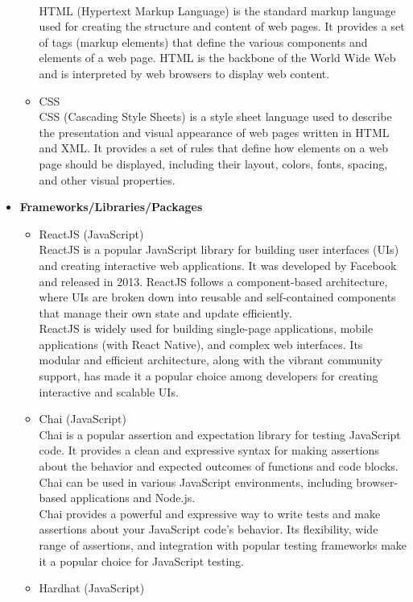 \documentclass[oneside, 12pt]{book}
\begin{document}
\begin{itemize}
\begin{itemize}
		      \\HTML (Hypertext Markup Language) is the standard markup language used for creating the structure and content of web pages. It provides a set of tags (markup elements) that define the various components and elements of a web page. HTML is the backbone of the World Wide Web and is interpreted by web browsers to display web content.
		\item CSS
		      \\CSS (Cascading Style Sheets) is a style sheet language used to describe the presentation and visual appearance of web pages written in HTML and XML. It provides a set of rules that define how elements on a web page should be displayed, including their layout, colors, fonts, spacing, and other visual properties.
	\end{itemize}
	\item\textbf{Frameworks/Libraries/Packages}
	\begin{itemize}
		\item ReactJS (JavaScript)
		      \\ReactJS is a popular JavaScript library for building user interfaces (UIs) and creating interactive web applications. It was developed by Facebook and released in 2013. ReactJS follows a component-based architecture, where UIs are broken down into reusable and self-contained components that manage their own state and update efficiently.
		      \\ReactJS is widely used for building single-page applications, mobile applications (with React Native), and complex web interfaces. Its modular and efficient architecture, along with the vibrant community support, has made it a popular choice among developers for creating interactive and scalable UIs.
		\item Chai (JavaScript)
		      \\Chai is a popular assertion and expectation library for testing JavaScript code. It provides a clean and expressive syntax for making assertions about the behavior and expected outcomes of functions and code blocks. Chai can be used in various JavaScript environments, including browser-based applications and Node.js.
		      \\Chai provides a powerful and expressive way to write tests and make assertions about your JavaScript code's behavior. Its flexibility, wide range of assertions, and integration with popular testing frameworks make it a popular choice for JavaScript testing.
		\item Hardhat (JavaScript)

\end{itemize}
\end{itemize}
\end{document}
